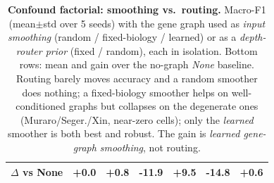 \documentclass[letterpaper]{article}
\begin{document}
\begin{table}[t]
{\begin{tabular}{lcccccc}
$\Delta$ vs None & +0.0 & +0.8 & -11.9 & \textbf{+9.5} & -14.8 & +0.6 \\
\bottomrule
\end{tabular}}
\caption{\textbf{Confound factorial: smoothing vs.\ routing.} Macro-F1 (mean$\pm$std over
5 seeds) with the gene graph used as \emph{input smoothing} (random / fixed-biology /
learned) or as a \emph{depth-router prior} (fixed / random), each in isolation. Bottom
rows: mean and gain over the no-graph \emph{None} baseline. Routing barely moves accuracy
and a random smoother does nothing; a fixed-biology smoother helps on well-conditioned
graphs but collapses on the degenerate ones (Muraro/Seger./Xin, near-zero cells); only the
\emph{learned} smoother is both best and robust. The gain is \emph{learned gene-graph
smoothing}, not routing.}
\label{tab:confound}
\end{table}
\end{document}
